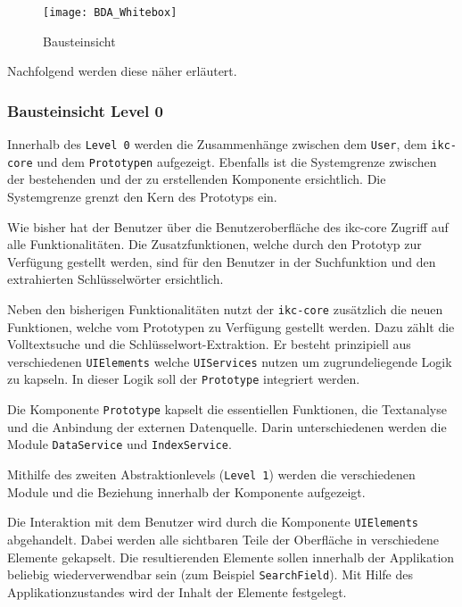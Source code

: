 \begin{figure}[H]
\centering
\texttt{[image: BDA\_Whitebox]}
\caption{Bausteinsicht}
\label{fig:bausteinsicht}
\end{figure}

Nachfolgend werden diese näher erläutert.

\subsubsection{Bausteinsicht Level 0}
Innerhalb des \texttt{Level 0} werden die Zusammenhänge zwischen dem \texttt{User}, dem \texttt{ikc-core} und dem \texttt{Prototypen} aufgezeigt. Ebenfalls ist die Systemgrenze zwischen der bestehenden und der zu erstellenden Komponente ersichtlich. Die Systemgrenze grenzt den Kern des Prototyps ein.

Wie bisher hat der Benutzer über die Benutzeroberfläche des \gls{ikc-core} Zugriff auf alle Funktionalitäten. Die Zusatzfunktionen, welche durch den Prototyp zur Verfügung gestellt werden, sind für den Benutzer in der Suchfunktion und den extrahierten Schlüsselwörter ersichtlich.

Neben den bisherigen Funktionalitäten nutzt der \texttt{ikc-core} zusätzlich die neuen Funktionen, welche vom Prototypen zu Verfügung gestellt werden. Dazu zählt die Volltextsuche und die Schlüs\-sel\-wort-\-Ex\-trak\-tion. Er besteht prinzipiell aus verschiedenen \texttt{UI\-Ele\-ments} welche \texttt{UI\-Ser\-vices} nutzen um zugrundeliegende Logik zu kapseln. In dieser Logik soll der \texttt{Prototype} integriert werden.

Die Komponente \texttt{Prototype} kapselt die essentiellen Funktionen, die Textanalyse und die Anbindung der externen Datenquelle. Darin unterschiedenen werden die Module \texttt{DataService} und \texttt{IndexService}.

Mithilfe des zweiten Abstraktionlevels (\texttt{Level 1}) werden die verschiedenen Module und die Beziehung innerhalb der Komponente aufgezeigt. 

Die Interaktion mit dem Benutzer wird durch die Komponente \texttt{UI\-Ele\-ments} abgehandelt. Dabei werden alle sichtbaren Teile der Oberfläche in verschiedene Elemente gekapselt. Die resultierenden Elemente sollen innerhalb der Applikation beliebig wiederverwendbar sein (zum Beispiel \texttt{SearchField}). Mit Hilfe des Applikationzustandes wird der Inhalt der Elemente festgelegt.

